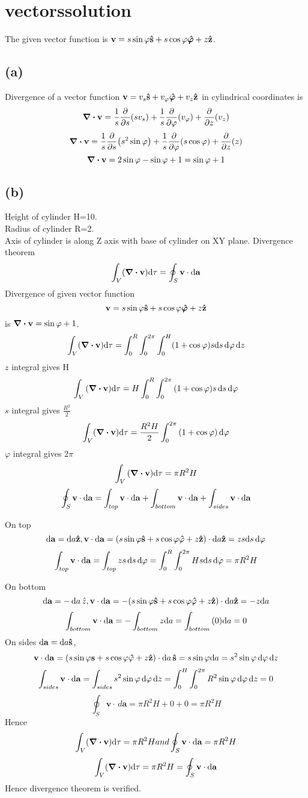
\section*{vectorssolution}
The given vector function is \(
\vb{v}=s\sin{\varphi}\vu{s}+s\cos{\varphi}\vu{\bm{\varphi}}+z\vu{z}
\).
\subsection*{(a)}
Divergence of a vector function 
\(\vb{v}=v_s\vu{s}+v_{\varphi}\vu{\bm{\varphi}}+v_z\vu{z} \) in cylindrical coordinates is \[\div{\vb{v}}=\frac{1}{s}\pdv{s}(sv_s)+\frac{1}{s}\pdv{\varphi}(v_{\varphi})+\pdv{z}(v_z)\]
\[\div{\vb{v}}=\frac{1}{s}\pdv{s}(s^2\sin{\varphi})+\frac{1}{s}\pdv{\varphi}(s\cos{\varphi})+\pdv{z}(z)\]
\[\div{\vb{v}}=2\sin{\varphi}-\sin{\varphi}+1=\sin{\varphi}+1\]
\subsection*{(b)}
Height of cylinder H=10.\\
Radius of cylinder R=2.\\
Axis of cylinder is along Z axis with base of cylinder on XY plane.
Divergence theorem \[\int_{V}(\div{\vb{v}})\dd\tau=\oint_{S}{\vb{v}\cdot\dd{\vb{a}}}\]
Divergence of given vector function \[\vb{v}=s\sin{\varphi}\vu{s}+s\cos{\varphi}\vu{\bm{\varphi}}+z\vu{z}\] is  \(\div{\vb{v}}=\sin{\varphi}+1\).
\[\int_{V}(\div{\vb{v}})\dd\tau=\int_{0}^{R}\int_{0}^{2\pi}\int_{0}^{H}(1+\cos{\varphi})s\dd s\dd{\varphi}\dd z
\]
$z$ integral gives H
\[\int_{V}{(\div{\vb{v}})\dd\tau}=H\int_{0}^{R}\int_{0}^{2\pi}{(1+\cos{\varphi})s\dd{s}\dd{\varphi}}
\]
$s$ integral gives \(\frac{R^2}{2}\)
\[\int_{V}(\div{\vb{v}})\dd\tau=\frac{R^2H}{2}\int_{0}^{2\pi}{(1+\cos{\varphi})\dd{\varphi}}\]
\(\varphi\) integral gives \(2\pi\)
\[\int_{V}{(\div{\vb{v}})\dd\tau}=\pi{R^2H}\]
\[
\oint_{S}\vb{v}\cdot\dd{\vb{a}}=\int_{top}\vb{v}\cdot\dd\vb{a}+\int_{bottom}\vb{v}\cdot\dd\vb{a}+\int_{sides}\vb{v}\cdot\dd\vb{a}\]

On top \[\dd\vb{a}=\dd a\vu{z}, \vb{v}\cdot\dd\vb{a}=(s\sin{\varphi}\vu{s}+s\cos{\varphi}\vu{\varphi}+z\vu{z})\cdot\dd a\vu{z}=zs\dd s\dd{\varphi}\]
\[\int_{top}\vb{v}\cdot\dd\vb{a}=\int_{top}zs\dd{s}\dd{\varphi}=\int_{0}^{R}\int_{0}^{2\pi}Hs\dd s\dd{\varphi}=\pi{R^2H}\]

On bottom \[\dd\vb{a}=-\dd{a}\hat{z}, \vb{v}\cdot\dd\mathbf{a}=-(s\sin{\varphi}\vu{s}+s\cos{\varphi}\vu{\varphi}+z\vu{z})\cdot\dd a\vu{z}=-z \dd a\]
\[\int_{bottom}\vb{v}\cdot\dd\vb{a}=-\int_{bottom}{z\dd a}=\int_{bottom}{(0)\dd a}=0\]
On sides \(\dd{\vb{a}}=\dd a\vu{s}\), \[\vb{v}\cdot\dd{\vb{a}}=(s\sin{\varphi}\vb{s}+s\cos{\varphi}\vu{\varphi}+z\vu{z})\cdot\dd a\,\vu{s}=s\sin{\varphi}\dd a=s^2\sin{\varphi}\dd{\varphi}\dd z\]
\[\int_{sides}\vb{v}\cdot\dd\vb{a}=\int_{sides}s^2\sin{\varphi}\dd{\varphi}\dd{z}=\int_{0}^{H}\int_{0}^{2\pi}R^2\sin{\varphi}\dd{\varphi}\dd{z}=0\]
\[\oint_{S}{\mathbf{v}\cdot\,d{\mathbf{a}}}=\pi{R^2H}+0+0=\pi{R^2H}\]
Hence \[\int_{V}(\div{\vb{v}})\dd\tau=\pi{R^2H} and \oint_{S}\vb{v}\cdot\dd\vb{a}=\pi{R^2H}\]
\[\int_{V}(\div{\vb{v}})\dd\tau=\pi{R^2H}=\oint_{S}\vb{v}\cdot\dd{\vb{a}}\]
Hence divergence theorem is verified.
